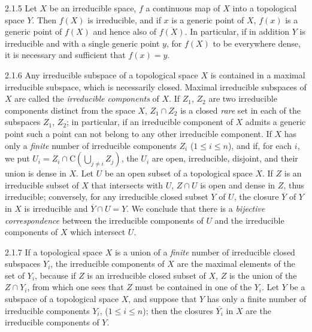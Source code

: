 \begin{env}{2.1.5}
\label{env-0.2.1.5}
Let $X$ be an irreducible space, $f$ a continuous map of $X$ into a topological space $Y$.
Then $f(X)$ is irreducible, and if $x$ is a generic point of $X$, $f(x)$ is a generic point
of $f(X)$ and hence also of $\overline{f(X)}$. In particular, if in addition $Y$ is
irreducible and with a single generic point $y$, for $f(X)$ to be everywhere dense, it is
necessary and sufficient that $f(x)=y$.
\end{env}

\begin{env}{2.1.6}
\label{env-0.2.1.6}
Any irreducible subspace of a topological space $X$ is contained in a maximal irreducible
subspace, which is necessarily closed. Maximal irreducible subspaces of $X$ are called the
\emph{irreducible components} of $X$. If $Z_1$, $Z_2$ are two irreducible components distinct
from the space $X$, $Z_1\cap Z_2$ is a closed \emph{rare} set in each of the subspaces $Z_1$,
$Z_2$; in particular, if an irreducible component of $X$ admits a generic point
 such a point can not belong to any other irreducible component. If $X$ has
only a \emph{finite} number of irreducible components $Z_i$ ($1\leqslant i\leqslant n$), and
if, for each $i$, we put $U_i=Z_i\cap\mathrm{C}(\bigcup_{j\neq i}Z_j)$, the $U_i$ are open,
irreducible, disjoint, and their union is dense in $X$. Let $U$ be an open subset of a
topological space $X$. If $Z$ is an irreducible subset of $X$ that intersects with $U$,
$Z\cap U$ is open and dense in $Z$, thus irreducible; conversely, for any irreducible closed
subset $Y$ of $U$, the closure $\overline{Y}$ of $Y$ in $X$ is irreducible and
$\overline{Y}\cap U=Y$. We conclude that there is a \emph{bijective correspondence} between
the irreducible components of $U$ and the irreducible components of $X$ which intersect $U$.
\end{env}

\begin{env}{2.1.7}
\label{env-0.2.1.7}
If a topological space $X$ is a union of a \emph{finite} number of irreducible closed
subspaces $Y_i$, the irreducible components of $X$ are the maximal elements of the set of
$Y_i$, because if $Z$ is an irreducible closed subset of $X$, $Z$ is the union of the
$Z\cap Y_i$, from which one sees that $Z$ must be contained in one of the $Y_i$. Let $Y$ be a
subspace of a topological space $X$, and suppose that $Y$ has only a finite number of
irreducible components $Y_i$, ($1\leqslant i\leqslant n$); then the closures $\overline{Y_i}$
in $X$ are the irreducible components of $Y$.
\end{env}

